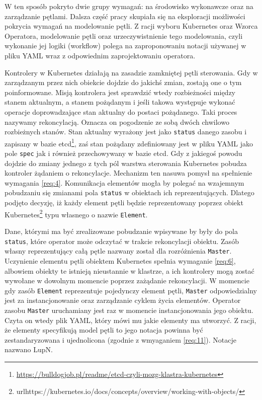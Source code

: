 W ten sposób pokryto dwie grupy wymagań: na środowisko wykonawcze oraz na zarządzanie pętlami. Dalsza część pracy skupiała się na eksploracji możliwości pokrycia wymagań na modelowanie pętli. Z racji wyboru Kubernetes oraz Wzorca Operatora, modelowanie pętli oraz urzeczywistnienie tego modelowania, czyli wykonanie jej logiki (workflow) polega na zaproponowaniu notacji używanej w pliku YAML wraz z odpowiednim zaprojektowaniu operatora. 

Kontrolery w Kubernetes działają na zasadzie zamkniętej pętli sterowania. Gdy w zarządzanym przez nich obiekcie dojdzie do jakichś zmian, zostają one o tym poinformowane. Misją kontrolera jest sprawdzić wtedy rozbieżności między stanem aktualnym, a stanem pożądanym i jeśli takowa występuje wykonać operacje doprowadzające stan aktualny do postaci pożądanego. Taki proces nazywamy rekoncylacją. Oznacza on pogodzenie ze sobą dwóch chwilowo rozbieżnych stanów. Stan aktualny wyrażony jest jako \texttt{status} danego zasobu i zapisany w bazie etcd\footnote{\url{https://bulldogjob.pl/readme/etcd-czyli-mozg-klastra-kubernetes}}, zaś stan pożądany zdefiniowany jest w pliku YAML jako pole \texttt{spec} jak i również przechowywany w bazie etcd. Gdy z jakiegoś powodu dojdzie do zmiany jednego z tych pól warstwa sterowania Kubernetes pobudza kontroler żądaniem o rekoncylacje. Mechanizm ten nasuwa pomysł na spełnienie wymagania \ref{req:4}. Komunikacja elementów mogła by polegać na wzajemnym pobudzaniu się zmianami pola \texttt{status} w obiektach ich reprezentujących. Dlatego podjęto decyzję, iż każdy element pętli będzie reprezentowany poprzez obiekt Kubernetes\footnote{url{https://kubernetes.io/docs/concepts/overview/working-with-objects/}} typu własnego o nazwie \texttt{Element}.

Dane, którymi ma być zrealizowane pobudzanie wpisywane by były do pola \texttt{status}, które operator może odczytać w trakcie rekoncylacji obiektu. Zasób własny reprezentujący całą pętle nazwany został dla rozróżnienia \texttt{Master}. Uczynienie elementu pętli obiektem Kubernetes spełnia wymaganie \ref{req:6}, albowiem obiekty te istnieją nieustannie w klastrze, a ich kontrolery mogą zostać wywołane w dowolnym momencie poprzez zażądanie rekoncylacji. W momencie gdy zasób \texttt{Element} reprezentuje pojedynczy element pętli, \texttt{Master} odpowiedzialny jest za instancjonowanie oraz zarządzanie cyklem życia elementów. Operator zasobu \texttt{Master} uruchamiany jest raz w momencie instancjonowania jego obiektu. Czyta on wtedy plik YAML, który mówi mu jakie elementy ma utworzyć. Z racji, że elementy specyfikują model pętli to jego notacja powinna być zestandaryzowana i ujednolicona (zgodnie z wmyaganiem \ref{req:11}). Notacje nazwano LupN. 

